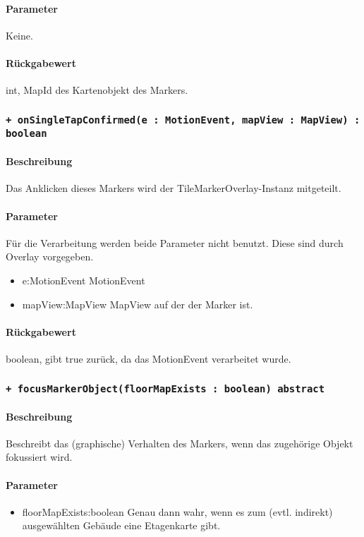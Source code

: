 \paragraph*{Parameter}
Keine.
\paragraph*{Rückgabewert}
int, MapId des Kartenobjekt des Markers.

\subsubsection{\texttt{+ onSingleTapConfirmed(e : MotionEvent, mapView : MapView) : boolean}}%
\paragraph*{Beschreibung}
Das Anklicken dieses Markers wird der TileMarkerOverlay-Instanz mitgeteilt.
\paragraph*{Parameter}
Für die Verarbeitung werden beide Parameter nicht benutzt. Diese sind durch Overlay vorgegeben.
\begin{itemize}
    \item e:MotionEvent MotionEvent
    \item mapView:MapView MapView auf der der Marker ist.
\end{itemize}
\paragraph*{Rückgabewert}
boolean, gibt true zurück, da das MotionEvent verarbeitet wurde.

\subsubsection{\texttt{+ focusMarkerObject(floorMapExists : boolean) {abstract}}}%
\paragraph*{Beschreibung}
Beschreibt das (graphische) Verhalten des Markers, wenn das zugehörige Objekt fokussiert wird.
\paragraph*{Parameter}
\begin{itemize}
    \item floorMapExists:boolean Genau dann wahr, wenn es zum (evtl. indirekt) ausgewählten Gebäude eine Etagenkarte gibt.
\end{itemize}
